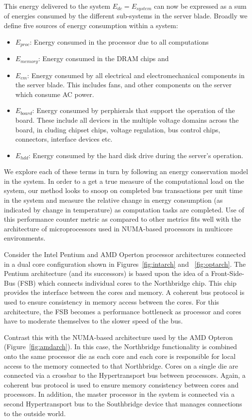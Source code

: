 \documentclass[times, 10pt,onecolumn]{article}
\begin{document}
This energy delivered to the system $E_{dc} = E_{system}$ can now be
expressed as a sum of energies consumed by the different sub-systems in
the server blade.  Broadly we define five sources of energy consumption
within a system:
\begin{itemize}
\item $E_{proc}$: Energy consumed in the processor due to all
  computations
\item $E_{memory}$: Energy consumed in the DRAM chips and
\item $E_{em}$: Energy consumed by all electrical and electromechanical
  components in the server blade.  This includes fans, and other
  components on the server which consume AC power.
\item $E_{board}$: Energy consumed by perphierals that support the
  operation of the board. These include all devices in the multiple
  voltage domains across the board, in cluding chipset chips, voltage
  regulation, bus control chips, connectors, interface devices etc.
\item $E_{hdd}$: Energy consumed by the hard disk drive during the
  server's operation.
\end{itemize}

We explore each of these terms in turn by following an energy
conservation model in the system.  In order to a get a true measure of
the computational load on the system, our method looks to snoop on
completed bus transactions per unit time in the system and measure the
relative change in energy consumption (as indicated by change in
temperature) as computation tasks are completed.  Use of this
performance counter metric as compared to other metrics fits well with
the architecture of microprocessors used in NUMA-based processors in
multicore environments.

Consider the Intel Pentium and AMD Operton processor architectures
connected in a dual core configuration shown in
Figures~\ref{fig:intarch} and ~\ref{fig:optarch}.  The Pentium
architecture (and its successors) is based upon the idea of a
Front-Side-Bus (FSB) which connects individual cores to the Northbridge
chip.  This chip provides the interface between the cores and memory.  A
coherent bus protocol is used to ensure consistency in memory access
between the cores.  For this architecture, the FSB becomes a performance
bottleneck as processor and cores have to moderate themselves to the
slower speed of the bus.

Contrast this with the NUMA-based architecture used by the AMD Opteron (Figure~\ref{fig:amdarch}).  
In this case, the Northbridge functionality is combined
onto the same processor die as each core and each core is responsible for
local access to the memory connected to that Northbridge. Cores on a single
die are connected via a crossbar to the Hypertransport bus between
processors.  Again, a coherent bus protocol is used to ensure memory
consistency between cores and processors. In addition, the master processor
in the system is connected via a second Hypertransport bus to the Southbridge
device that manages connections to the outside world.
\end{document}

